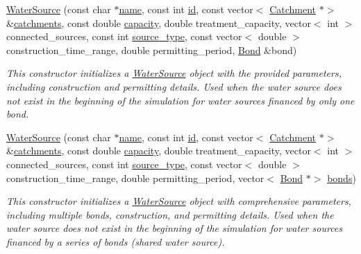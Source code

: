 \begin{DoxyCompactItemize}
\mbox{\hyperlink{classWaterSource_a48641ff06b69505ab298f4f23e759a22}{Water\+Source}} (const char $\ast$\mbox{\hyperlink{classWaterSource_a846ea74c5b453d014f594d41fee8c765}{name}}, const int \mbox{\hyperlink{classWaterSource_a6eafe5dfefd317877d1244e8a7c6e742}{id}}, const vector$<$ \mbox{\hyperlink{classCatchment}{Catchment}} $\ast$$>$ \&\mbox{\hyperlink{classWaterSource_a8c18c34f23f8a06685c1d12f462ed830}{catchments}}, const double \mbox{\hyperlink{classWaterSource_a2ec257b415b248214a8bce7fc5267723}{capacity}}, double treatment\+\_\+capacity, vector$<$ int $>$ connected\+\_\+sources, const int \mbox{\hyperlink{classWaterSource_afdd12c29fc74ea21dff1f1be9b8c2b7b}{source\+\_\+type}}, const vector$<$ double $>$ construction\+\_\+time\+\_\+range, double permitting\+\_\+period, \mbox{\hyperlink{classBond}{Bond}} \&bond)
\begin{DoxyCompactList}\small\item\em This constructor initializes a {\ttfamily \mbox{\hyperlink{classWaterSource}{Water\+Source}}} object with the provided parameters, including construction and permitting details. Used when the water source does not exist in the beginning of the simulation for water sources financed by only one bond. \end{DoxyCompactList}\item 
\mbox{\hyperlink{classWaterSource_a284e207f074da6f485d41f65ac025cf1}{Water\+Source}} (const char $\ast$\mbox{\hyperlink{classWaterSource_a846ea74c5b453d014f594d41fee8c765}{name}}, const int \mbox{\hyperlink{classWaterSource_a6eafe5dfefd317877d1244e8a7c6e742}{id}}, const vector$<$ \mbox{\hyperlink{classCatchment}{Catchment}} $\ast$$>$ \&\mbox{\hyperlink{classWaterSource_a8c18c34f23f8a06685c1d12f462ed830}{catchments}}, const double \mbox{\hyperlink{classWaterSource_a2ec257b415b248214a8bce7fc5267723}{capacity}}, double treatment\+\_\+capacity, vector$<$ int $>$ connected\+\_\+sources, const int \mbox{\hyperlink{classWaterSource_afdd12c29fc74ea21dff1f1be9b8c2b7b}{source\+\_\+type}}, const vector$<$ double $>$ construction\+\_\+time\+\_\+range, double permitting\+\_\+period, vector$<$ \mbox{\hyperlink{classBond}{Bond}} $\ast$$>$ \mbox{\hyperlink{classWaterSource_a413b094e11bdce62f4d82e5bb9e4706e}{bonds}})
\begin{DoxyCompactList}\small\item\em This constructor initializes a {\ttfamily \mbox{\hyperlink{classWaterSource}{Water\+Source}}} object with comprehensive parameters, including multiple bonds, construction, and permitting details. Used when the water source does not exist in the beginning of the simulation for water sources financed by a series of bonds (shared water source). \end{DoxyCompactList}\item 
$$
\end{DoxyCompactItemize}
